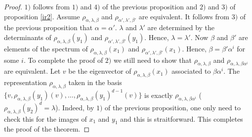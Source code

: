 \documentclass[12pt, reqno]{amsart}
\begin{document}
 \begin{proof}
$1)$ follows from $1)$ and $4)$ of the previous proposition and $2)$ and $3)$ of proposition \ref{ir2}. Assume $\rho_{\alpha,\lambda,\beta}$ and $\rho_{\alpha',\lambda',\beta'}$ are equivalent. It follows from $3)$ of the previous proposition that $\alpha=\alpha'$. $\lambda$ and $\lambda'$ are determined by the determinants of $\rho_{\alpha,\lambda,\beta}(y_1)$ and $\rho_{\alpha',\lambda',\beta'}(y_1)$. Hence, $\lambda=\lambda'$. Now $\beta$ and $\beta'$ are elements of the spectrum of $\rho_{\alpha,\lambda,\beta}(x_1)$ and $\rho_{\alpha',\lambda',\beta'}(x_1)$. Hence, $\beta=\beta'\alpha^i$ for some $i$. To complete the proof of $2)$ we still need to show that $\rho_{\alpha,\lambda,\beta}$ and $\rho_{\alpha,\lambda,\beta\alpha^i}$ are equivalent. Let $v$ be the eigenvector of $\rho_{\alpha,\lambda,\beta}(x_1)$ associated to $\beta \alpha^i$. The representation $\rho_{\alpha,\lambda,\beta}$ taken in the basis $\{v,\rho_{\alpha,\lambda,\beta}(y_1)(v),\dots,\rho_{\alpha,\lambda,\beta}(y_1)^{d-1}(v)\}$ is exactly $\rho_{\alpha,\lambda,\beta\alpha^i}$ ($\rho_{\alpha,\lambda,\beta}(y_2)^d=\lambda$). Indeed,  by $1)$ of the previous proposition, one only need to check this for the images of $x_1$ and $y_1$ and this is straitforward. This completes the proof of the theorem.

\end{proof}
\end{document}
